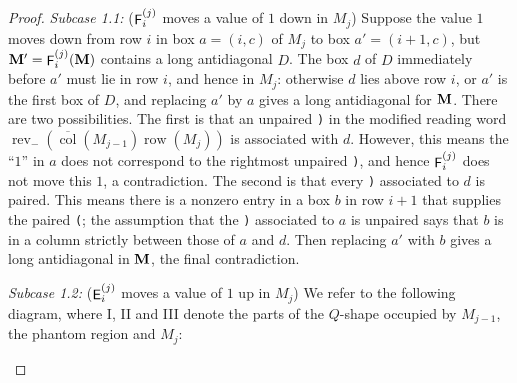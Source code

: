 \documentclass[12pt]{amsart}
\DeclareMathOperator{\mate}{\sf E}
\DeclareMathOperator{\matf}{\sf F}
\newcommand{\cell}{.28}
\newcommand{\tile}[5]{%
\begin{scope}[shift={(#1,#2)}]
  \draw[line width =.1pt, step=\cell] (0,0) grid ({#3*\cell},{#4*\cell});
  #5
\end{scope}
}
\newcommand{\phantomtile}[5]{%
\begin{scope}[shift={(#1,#2)}]
  \fill[gray!15] (0,0) rectangle ({#3*\cell},{#4*\cell});
  \draw[gray!70, dashed, step=\cell] (0,0) grid ({#3*\cell},{#4*\cell});
  #5
\end{scope}
}
\newcommand{\numcell}[3]{%
  \node at ({(#1+.5)*\cell},{(2.5-#2)*\cell}) {\scriptsize $#3$};
}
\theoremstyle{definition}
\theoremstyle{remark}
\begin{document}
\begin{proof}
\smallskip
\noindent\emph{Subcase 1.1:} ($\matf_i^{{(j)}}$ moves a value of $1$ down in $M_j$)
Suppose the value $1$ moves down from row $i$ in box $a=(i,c)$ of $M_j$ to box
$a'=(i+1,c)$, but ${\bf M}'=\matf_i^{(j)}({\bf M})$ contains a long antidiagonal $D$. The
box $d$ of $D$ immediately before $a'$ must lie in row $i$, and hence in $M_j$: otherwise
$d$ lies above row $i$, or $a'$ is the first box of $D$, and replacing $a'$ by $a$ gives a
long antidiagonal for ${\bf M}$. There are two possibilities. The first is that an unpaired
{\tt )} in the modified reading word
$\operatorname{rev}_{-}(\overline{\operatorname{col}}(M_{j-1})\operatorname{row}(M_j))$ is
associated with $d$. However, this means the ``$1$'' in $a$ does not correspond to the
rightmost unpaired {\tt )}, and hence $\matf_{i}^{(j)}$ does not move this $1$, a
contradiction. The second is that every {\tt )} associated to $d$ is paired. This means
there is a nonzero entry in a box $b$ in row $i+1$ that supplies the paired {\tt (}; the
assumption that the {\tt )} associated to $a$ is unpaired says that $b$ is in a column
strictly between those of $a$ and $d$. Then replacing $a'$ with $b$ gives a long
antidiagonal in ${\bf M}$, the final contradiction.

\smallskip
\noindent\emph{Subcase 1.2:} ($\mate_i^{(j)}$ moves a value of $1$ up in $M_j$)
We refer to the following diagram, where I, II and III denote the parts of the $Q$-shape
occupied by $M_{j-1}$, the phantom region and $M_j$:
\begin{figure}[h]
  \centering
\end{figure}


\end{proof}
\end{document}
